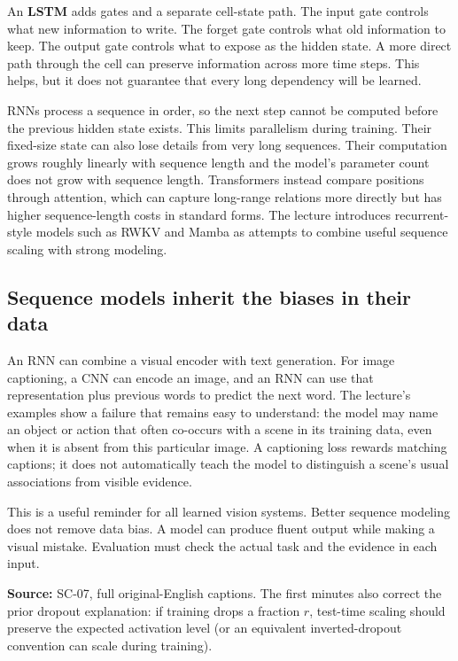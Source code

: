 An \textbf{LSTM} adds gates and a separate cell-state path. The input gate controls what new information to write. The forget gate controls what old information to keep. The output gate controls what to expose as the hidden state. A more direct path through the cell can preserve information across more time steps. This helps, but it does not guarantee that every long dependency will be learned.

RNNs process a sequence in order, so the next step cannot be computed before the previous hidden state exists. This limits parallelism during training. Their fixed-size state can also lose details from very long sequences. Their computation grows roughly linearly with sequence length and the model's parameter count does not grow with sequence length. Transformers instead compare positions through attention, which can capture long-range relations more directly but has higher sequence-length costs in standard forms. The lecture introduces recurrent-style models such as RWKV and Mamba as attempts to combine useful sequence scaling with strong modeling.

\subsection{Sequence models inherit the biases in their data}\label{04-visual-computing-ii-ch031-sequence-models-inherit-the-biases-in-their-data}

An RNN can combine a visual encoder with text generation. For image captioning, a CNN can encode an image, and an RNN can use that representation plus previous words to predict the next word. The lecture's examples show a failure that remains easy to understand: the model may name an object or action that often co-occurs with a scene in its training data, even when it is absent from this particular image. A captioning loss rewards matching captions; it does not automatically teach the model to distinguish a scene's usual associations from visible evidence.

This is a useful reminder for all learned vision systems. Better sequence modeling does not remove data bias. A model can produce fluent output while making a visual mistake. Evaluation must check the actual task and the evidence in each input.

\textbf{Source:} SC-07, full original-English captions. The first minutes also correct the prior dropout explanation: if training drops a fraction \(r\), test-time scaling should preserve the expected activation level (or an equivalent inverted-dropout convention can scale during training).

